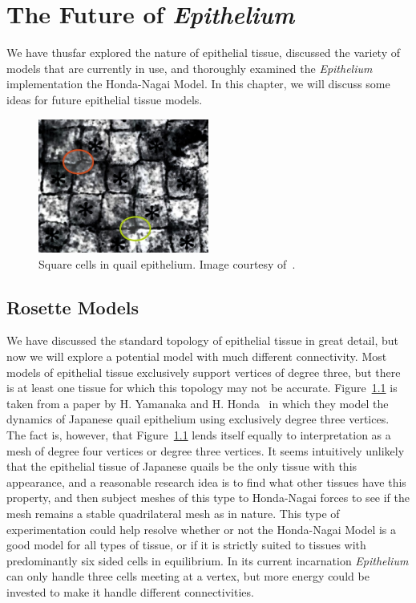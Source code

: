 \chapter{The Future of \emph{Epithelium}}
\label{chap:advances}

We have thusfar explored the nature of epithelial tissue, discussed the variety of models that are currently in use, and thoroughly examined the \emph{Epithelium} implementation the Honda-Nagai Model. In this chapter, we will discuss some ideas for future epithelial tissue models. 

\begin{figure}[hb]
\centering
\includegraphics[width=0.5\textwidth]{../diagrams/checkers.jpg}
\caption{Square cells in quail epithelium. Image courtesy of~\cite{Checkers}.}
\label{fig:quail}
\end{figure}

\section{Rosette Models}
We have discussed the standard topology of epithelial tissue in great detail, but now we will explore a potential model with much different connectivity. Most models of epithelial tissue exclusively support vertices of degree three, but there is at least one tissue for which this topology may not be accurate. Figure~\ref{fig:quail} is taken from a paper by H. Yamanaka and H. Honda~\cite{Checkers} in which they model the dynamics of Japanese quail epithelium using exclusively degree three vertices. The fact is, however, that Figure~\ref{fig:quail} lends itself equally to interpretation as a mesh of degree four vertices or degree three vertices. It seems intuitively unlikely that the epithelial tissue of Japanese quails be the only tissue with this appearance, and a reasonable research idea is to find what other tissues have this property, and then subject meshes of this type to Honda-Nagai forces to see if the mesh remains a stable quadrilateral mesh as in nature. This type of experimentation could help resolve whether or not the Honda-Nagai Model is a good model for all types of tissue, or if it is strictly suited to tissues with predominantly six sided cells in equilibrium. In its current incarnation \emph{Epithelium} can only handle three cells meeting at a vertex, but more energy could be invested to make it handle different connectivities.

